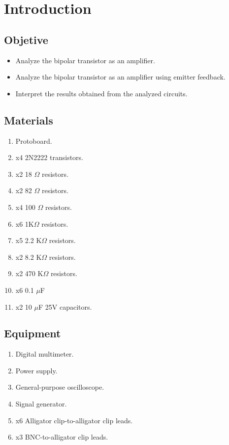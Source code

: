 \newpage

\section{Introduction}

\subsection{Objetive}

\begin{itemize}
    \item Analyze the bipolar transistor as an amplifier.
    \item Analyze the bipolar transistor as an amplifier using emitter feedback.
    \item Interpret the results obtained from the analyzed circuits.
\end{itemize}


\subsection{Materials}

\begin{enumerate}
    \item Protoboard.
    \item x4 2N2222 transistors.
    \item x2 18 $\Omega$ resistors.
    \item x2 82 $\Omega$ resistors.
    \item x4 100 $\Omega$ resistors.
    \item x6 1K$\Omega$ resistors.
    \item x5 2.2 K$\Omega$ resistors.
    \item x2 8.2 K$\Omega$ resistors.
    \item x2 470 K$\Omega$ resistors.
    \item x6 0.1 $\mu$F
    \item x2 10 $\mu$F 25V capacitors.
\end{enumerate}


\subsection{Equipment}

\begin{enumerate}
    \item Digital multimeter.
    \item Power supply.
    \item General-purpose oscilloscope.
    \item Signal generator.
    \item x6 Alligator clip-to-alligator clip leads.
    \item x3 BNC-to-alligator clip leads.
\end{enumerate}

